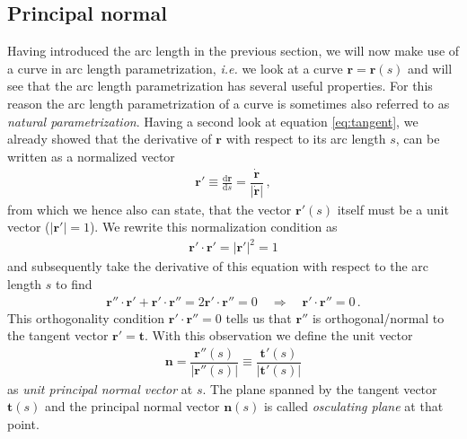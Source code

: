 \documentclass[11pt, DINA4, fleqn]{amsart}
\def\df{\mathrm{d}\xspace}
\newcommand{\dd}[2]{\frac{\df#1}{\df#2}}
\def\vr{\boldsymbol{r}\xspace}
\def\vrd{\dot{\vr}\xspace}
\def\vrp{{\vr}'\xspace}
\def\vrpp{{\vr}''\xspace}
\def\vt{\boldsymbol{t}\xspace}
\def\vn{\boldsymbol{n}\xspace}
\begin{document}
\subsection{Principal normal}
Having introduced the arc length in the previous section, we will now make use of a curve in arc length parametrization, \textit{i.e.}
we look at a curve $\vr = \vr(s)$ and will see that the arc length parametrization has several useful properties.
For this reason the arc length parametrization of a curve is sometimes also referred to as \emph{natural parametrization}.
Having a second look at equation \eqref{eq:tangent}, we already showed that the derivative of $\vr$ with respect to its arc length $s$, can be written as a normalized vector
\begin{align}
\vrp \equiv \dd{\vr}{s} = \dfrac{\vrd}{|\vrd|} \, ,
\end{align}
from which we hence also can state, that the vector $\vrp(s)$ itself must be a unit vector ($|\vrp| = 1$).
We rewrite this normalization condition as
\begin{align}
\vrp \cdot \vrp = |\vrp|^2 = 1
\end{align}
and subsequently take the derivative of this equation with respect to the arc length $s$ to find
\begin{align}
\vrpp \cdot \vrp + \vrp\cdot \vrpp = 2\vrp\cdot\vrpp = 0 \quad \Longrightarrow \quad \vrp \cdot \vrpp = 0 \, .
\end{align}
This orthogonality condition $\vrp\cdot \vrpp = 0$ tells us that $\vrpp$ is orthogonal/normal to the tangent vector $\vrp = \vt$.
With this observation we define the unit vector
\begin{align}
\vn = \dfrac{\vrpp(s)}{|\vrpp(s)|} \equiv \dfrac{\vt'(s)}{|\vt'(s)|}
\label{eq:normalVector}
\end{align}
as \emph{unit principal normal vector} at $s$. The plane spanned by the tangent vector $\vt(s)$ and the principal normal vector $\vn(s)$
is called \emph{osculating plane} at that point.
\end{document}

